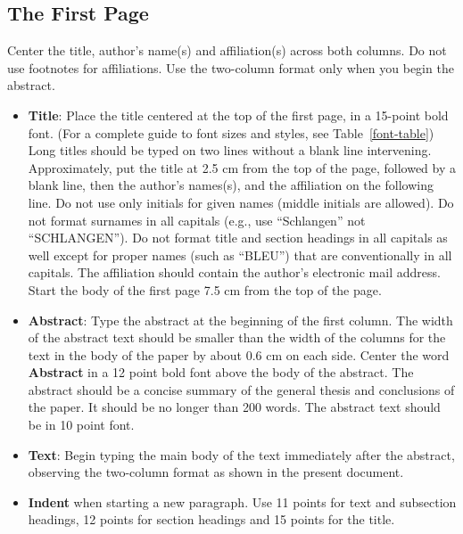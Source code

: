 \documentclass[11pt,table,xcdraw]{article}
\begin{document}
\subsection{The First Page}
\label{ssec:first}

Center the title, author's name(s) and affiliation(s) across both columns. Do not use footnotes for affiliations. Use the two-column format only when you begin the abstract.

\begin{itemize}
\item {\bf Title}: Place the title centered at the top of the first page, in
a 15-point bold font. (For a complete guide to font sizes and styles,
see Table~\ref{font-table}) Long titles should be typed on two lines
without a blank line intervening. Approximately, put the title at 2.5
cm from the top of the page, followed by a blank line, then the
author's names(s), and the affiliation on the following line. Do not
use only initials for given names (middle initials are allowed). Do
not format surnames in all capitals (e.g., use ``Schlangen'' not
``SCHLANGEN'').  Do not format title and section headings in all
capitals as well except for proper names (such as ``BLEU'') that are
conventionally in all capitals.  The affiliation should contain the
author's electronic mail address. Start the body of the first page 7.5 cm from the top of the
page.

\item {\bf Abstract}: Type the abstract at the beginning of the first
column. The width of the abstract text should be smaller than the
width of the columns for the text in the body of the paper by about
0.6 cm on each side. Center the word {\bf Abstract} in a 12 point bold
font above the body of the abstract. The abstract should be a concise
summary of the general thesis and conclusions of the paper. It should
be no longer than 200 words. The abstract text should be in 10 point font.

\item {\bf Text}: Begin typing the main body of the text immediately after
the abstract, observing the two-column format as shown in 
the present document.

\item {\bf Indent} when starting a new paragraph. Use 11 points for text and 
subsection headings, 12 points for section headings and 15 points for
the title. 

 
\end{itemize}
\end{document}
